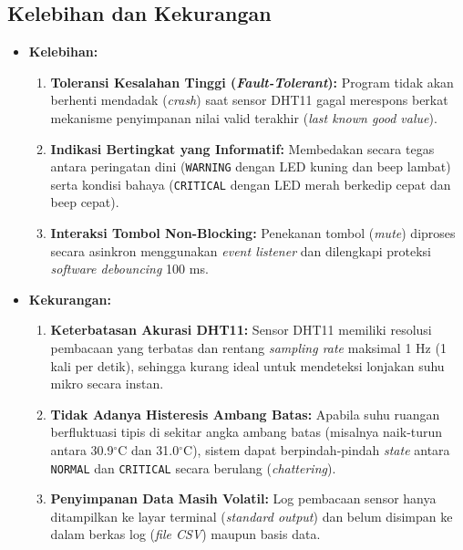 \documentclass[12pt, a4paper]{article}
\begin{document}
\subsection{Kelebihan dan Kekurangan}
\begin{itemize}
    \item \textbf{Kelebihan:}
    \begin{enumerate}
        \item \textbf{Toleransi Kesalahan Tinggi (\textit{Fault-Tolerant}):} 
        Program tidak akan berhenti mendadak (\textit{crash}) saat sensor DHT11 gagal merespons berkat mekanisme penyimpanan 
        nilai valid terakhir (\textit{last known good value}).
        \item \textbf{Indikasi Bertingkat yang Informatif:} 
        Membedakan secara tegas antara peringatan dini (\texttt{WARNING} dengan LED kuning dan beep lambat) serta kondisi bahaya 
        (\texttt{CRITICAL} dengan LED merah berkedip cepat dan beep cepat).
        \item \textbf{Interaksi Tombol Non-Blocking:} 
        Penekanan tombol (\textit{mute}) diproses secara asinkron menggunakan \textit{event listener} dan dilengkapi proteksi 
        \textit{software debouncing} 100 ms.
    \end{enumerate}
    \item \textbf{Kekurangan:}
    \begin{enumerate}
        \item \textbf{Keterbatasan Akurasi DHT11:} Sensor DHT11 memiliki resolusi pembacaan yang terbatas dan rentang 
        \textit{sampling rate} maksimal 1 Hz (1 kali per detik), sehingga kurang ideal untuk mendeteksi lonjakan suhu mikro 
        secara instan.
        \item \textbf{Tidak Adanya Histeresis Ambang Batas:} Apabila suhu ruangan berfluktuasi tipis di sekitar angka ambang batas 
        (misalnya naik-turun antara 30.9$^\circ$C dan 31.0$^\circ$C), sistem dapat berpindah-pindah \textit{state} antara 
        \texttt{NORMAL} dan \texttt{CRITICAL} secara berulang (\textit{chattering}).
        \item \textbf{Penyimpanan Data Masih Volatil:} Log pembacaan sensor hanya ditampilkan ke layar terminal 
        (\textit{standard output}) dan belum disimpan ke dalam berkas log (\textit{file CSV}) maupun basis data.
    \end{enumerate}
\end{itemize}
\end{document}
